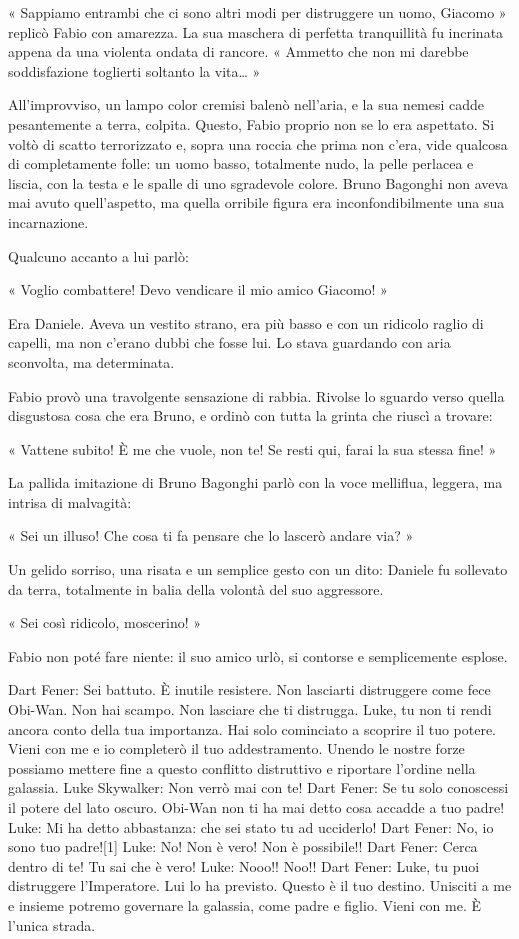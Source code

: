 « Sappiamo entrambi che ci sono altri modi per distruggere un uomo, Giacomo » replicò Fabio con amarezza. La sua maschera di perfetta tranquillità fu incrinata appena da una violenta ondata di rancore. « Ammetto che non mi darebbe soddisfazione toglierti soltanto la vita… »

All'improvviso, un lampo color cremisi balenò nell'aria, e la sua nemesi cadde pesantemente a terra, colpita. Questo, Fabio proprio non se lo era aspettato. Si voltò di scatto terrorizzato e, sopra una roccia che prima non c'era, vide qualcosa di completamente folle: un uomo basso, totalmente nudo, la pelle perlacea e liscia, con la testa e le spalle di uno sgradevole colore. Bruno Bagonghi non aveva mai avuto quell'aspetto, ma quella orribile figura era inconfondibilmente una sua incarnazione.

Qualcuno accanto a lui parlò:

« Voglio combattere! Devo vendicare il mio amico Giacomo! »

Era Daniele. Aveva un vestito strano, era più basso e con un ridicolo raglio di capelli, ma non c'erano dubbi che fosse lui. Lo stava guardando con aria sconvolta, ma determinata. 

Fabio provò una travolgente sensazione di rabbia. Rivolse lo sguardo verso quella disgustosa cosa che era Bruno, e ordinò con tutta la grinta che riuscì a trovare:

« Vattene subito! È me che vuole, non te! Se resti qui, farai la sua stessa fine! »

La pallida imitazione di Bruno Bagonghi parlò con la voce melliflua, leggera, ma intrisa di malvagità:

« Sei un illuso! Che cosa ti fa pensare che lo lascerò andare via? »

Un gelido sorriso, una risata e un semplice gesto con un dito: Daniele fu sollevato da terra, totalmente in balia della volontà del suo aggressore.

« Sei così ridicolo, moscerino! »

Fabio non poté fare niente: il suo amico urlò, si contorse e semplicemente esplose. 

Dart Fener: Sei battuto. È inutile resistere. Non lasciarti distruggere come fece Obi-Wan. Non hai scampo. Non lasciare che ti distrugga. Luke, tu non ti rendi ancora conto della tua importanza. Hai solo cominciato a scoprire il tuo potere. Vieni con me e io completerò il tuo addestramento. Unendo le nostre forze possiamo mettere fine a questo conflitto distruttivo e riportare l'ordine nella galassia.
Luke Skywalker: Non verrò mai con te!
Dart Fener: Se tu solo conoscessi il potere del lato oscuro. Obi-Wan non ti ha mai detto cosa accadde a tuo padre!
Luke: Mi ha detto abbastanza: che sei stato tu ad ucciderlo!
Dart Fener: No, io sono tuo padre![1]
Luke: No! Non è vero! Non è possibile!!
Dart Fener: Cerca dentro di te! Tu sai che è vero!
Luke: Nooo!! Noo!!
Dart Fener: Luke, tu puoi distruggere l'Imperatore. Lui lo ha previsto. Questo è il tuo destino. Unisciti a me e insieme potremo governare la galassia, come padre e figlio. Vieni con me. È l'unica strada.